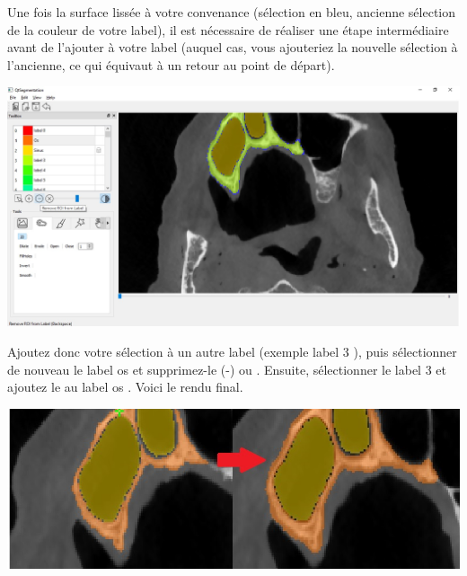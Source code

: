 \documentclass {article}
\begin{document}
Une fois la surface lissée à votre convenance (sélection en bleu, ancienne sélection de la couleur de votre label), il est nécessaire de réaliser une étape intermédiaire avant de l'ajouter à votre label (auquel cas, vous ajouteriez la nouvelle sélection à l'ancienne, ce qui équivaut à un retour au point de départ). 

\begin{center}
\includegraphics[scale=0.5]{Iconographie/Exemple_2_5.jpg}
\end{center}

Ajoutez donc votre sélection à un autre label (exemple \og label 3 \fg ), puis sélectionner de nouveau le label \og os \fg et supprimez-le (-) ou . Ensuite, sélectionner le \og label 3 \fg et ajoutez le au label \og os \fg . Voici le rendu final.

\begin{center}
\includegraphics[scale=0.5]{Iconographie/Exemple_2_6.jpg}
\end{center}
\end{document}
